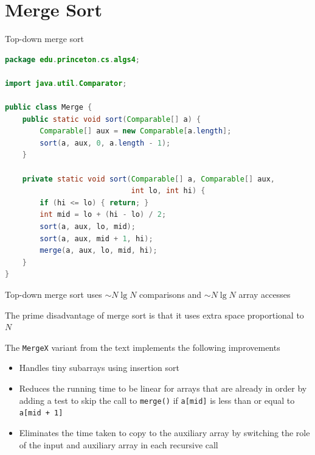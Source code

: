 \documentclass[8pt,a4paper,compress]{beamer}
\begin{document}
\section{Merge Sort}
\begin{frame}[fragile]
\pause

Top-down merge sort

\smallskip

\begin{lstlisting}[language=Java,style=focusin]
package edu.princeton.cs.algs4;

import java.util.Comparator;

public class Merge {
    public static void sort(Comparable[] a) {
        Comparable[] aux = new Comparable[a.length]; 
        sort(a, aux, 0, a.length - 1);
    }
    
    private static void sort(Comparable[] a, Comparable[] aux, 
                             int lo, int hi) {
        if (hi <= lo) { return; }
        int mid = lo + (hi - lo) / 2;
        sort(a, aux, lo, mid); 
        sort(a, aux, mid + 1, hi); 
        merge(a, aux, lo, mid, hi);
    }
}
\end{lstlisting}
\end{frame}

\begin{frame}[fragile]
\pause

Trace of merge sort
\begin{center}
}
\end{center}
\end{frame}

\begin{frame}[fragile]
\pause

Top-down merge sort uses $\sim N\lg N$ comparisons and $\sim N\lg N$ array accesses

\pause
\bigskip

The prime disadvantage of merge sort is that it uses extra space proportional to $N$

\pause
\bigskip

The \lstinline{MergeX} variant from the text implements the following improvements

\begin{itemize}
\item Handles tiny subarrays using insertion sort
\item Reduces the running time to be linear for arrays that are already in order by adding a test to skip the call to \lstinline$merge()$ if \lstinline$a[mid]$ is less than or equal to \lstinline$a[mid + 1]$
\item Eliminates the time taken to copy to the auxiliary array by switching the role of the input and auxiliary array in each recursive call
\end{itemize}
\end{frame}
\end{document}
